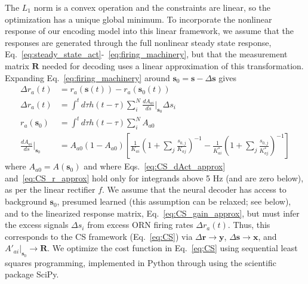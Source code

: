 \documentclass[9pt,twoside]{pnas-new}
\begin{document}
The $L_1$ norm is a convex operation and the constraints are linear, so the optimization has a unique global minimum. To incorporate the nonlinear response of our encoding model into this linear framework, we assume that the responses are generated through the full nonlinear steady state response, Eq.~\ref{eq:steady_state_act}-~\ref{eq:firing_machinery}, but that the measurement matrix $\mathbf R$ needed for decoding uses a linear approximation of this transformation.  Expanding Eq.~\ref{eq:firing_machinery} around $\mathbf s_0 = \mathbf s - \Delta \mathbf s$ gives
\begin{align}
\Delta r_a(t) &= r_a(\mathbf s(t)) - r_a(\mathbf s_0(t)) \\
\Delta r_a(t) &= \int^t d\tau h(t- \tau)\sum_i^N\frac{dA_{ai}}{ds}\big|_{\mathbf s_0}\Delta s_i \label{eq:CS_dAct_approx}\\
r_a(\mathbf s_0) &= \int^t d\tau h(t- \tau)\sum_i^NA_{a0} \label{eq:CS_r_approx} \\
\frac{dA_{ai}}{ds}\bigg|_{\mathbf s_0} &=  %
A_{a0}(1 - A_{a0})
\left[
\frac{1}{K_{ai}}\left(1 + \sum_j \frac{s_{0,j}}{K_{aj}}\right)^{-1}
-\frac{1}{K^*_{ai}}\left(1 + \sum_j \frac{s_{0, j}}{K^*_{aj}}\right)^{-1}
\right]
\label{eq:CS_gain_approx}
\end{align}
where $A_{a0} = A(\mathbf {s}_0)$ and where Eqs.~\ref{eq:CS_dAct_approx} and~\ref{eq:CS_r_approx} hold only for integrands above 5 Hz (and are zero below), as per the linear rectifier $f$. We assume that the neural decoder has access to background $\mathbf s_0$, presumed learned (this assumption can be relaxed; see below), and to  the linearized response matrix, Eq.~\ref{eq:CS_gain_approx}, but must infer the excess signals $\Delta s_i$ from excess ORN firing rates $\Delta r_a(t)$. Thus, this corresponds to the CS framework (Eq.~\ref{eq:CS})  via $\Delta \mathbf {r} \rightarrow \mathbf y$, $\Delta \mathbf s \rightarrow \mathbf x$, and $A'_{ai}\big|_{\mathbf s_0} \rightarrow \mathbf R$. We optimize the cost function in Eq.~\ref{eq:CS} using sequential least squares programming, implemented in Python through using the scientific package SciPy. 

\end{document}
